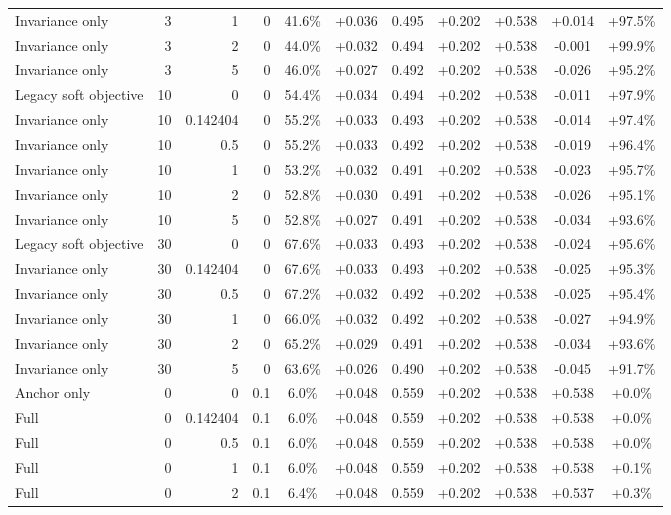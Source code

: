 \begin{table}[htbp]
\begin{tabular}{lrrrccccccc}
Invariance only & 3 & 1 & 0 & 41.6\% & +0.036 & 0.495 & +0.202 & +0.538 & +0.014 & +97.5\% \\
Invariance only & 3 & 2 & 0 & 44.0\% & +0.032 & 0.494 & +0.202 & +0.538 & -0.001 & +99.9\% \\
Invariance only & 3 & 5 & 0 & 46.0\% & +0.027 & 0.492 & +0.202 & +0.538 & -0.026 & +95.2\% \\
Legacy soft objective & 10 & 0 & 0 & 54.4\% & +0.034 & 0.494 & +0.202 & +0.538 & -0.011 & +97.9\% \\
Invariance only & 10 & 0.142404 & 0 & 55.2\% & +0.033 & 0.493 & +0.202 & +0.538 & -0.014 & +97.4\% \\
Invariance only & 10 & 0.5 & 0 & 55.2\% & +0.033 & 0.492 & +0.202 & +0.538 & -0.019 & +96.4\% \\
Invariance only & 10 & 1 & 0 & 53.2\% & +0.032 & 0.491 & +0.202 & +0.538 & -0.023 & +95.7\% \\
Invariance only & 10 & 2 & 0 & 52.8\% & +0.030 & 0.491 & +0.202 & +0.538 & -0.026 & +95.1\% \\
Invariance only & 10 & 5 & 0 & 52.8\% & +0.027 & 0.491 & +0.202 & +0.538 & -0.034 & +93.6\% \\
Legacy soft objective & 30 & 0 & 0 & 67.6\% & +0.033 & 0.493 & +0.202 & +0.538 & -0.024 & +95.6\% \\
Invariance only & 30 & 0.142404 & 0 & 67.6\% & +0.033 & 0.493 & +0.202 & +0.538 & -0.025 & +95.3\% \\
Invariance only & 30 & 0.5 & 0 & 67.2\% & +0.032 & 0.492 & +0.202 & +0.538 & -0.025 & +95.4\% \\
Invariance only & 30 & 1 & 0 & 66.0\% & +0.032 & 0.492 & +0.202 & +0.538 & -0.027 & +94.9\% \\
Invariance only & 30 & 2 & 0 & 65.2\% & +0.029 & 0.491 & +0.202 & +0.538 & -0.034 & +93.6\% \\
Invariance only & 30 & 5 & 0 & 63.6\% & +0.026 & 0.490 & +0.202 & +0.538 & -0.045 & +91.7\% \\
Anchor only & 0 & 0 & 0.1 & 6.0\% & +0.048 & 0.559 & +0.202 & +0.538 & +0.538 & +0.0\% \\
Full & 0 & 0.142404 & 0.1 & 6.0\% & +0.048 & 0.559 & +0.202 & +0.538 & +0.538 & +0.0\% \\
Full & 0 & 0.5 & 0.1 & 6.0\% & +0.048 & 0.559 & +0.202 & +0.538 & +0.538 & +0.0\% \\
Full & 0 & 1 & 0.1 & 6.0\% & +0.048 & 0.559 & +0.202 & +0.538 & +0.538 & +0.1\% \\
Full & 0 & 2 & 0.1 & 6.4\% & +0.048 & 0.559 & +0.202 & +0.538 & +0.537 & +0.3\% \\

\end{tabular}
\end{table}

